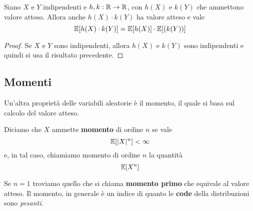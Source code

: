 \begin{corollary}
	Siano $X$ e $Y$ indipendenti e $h,k : \mathbb{R} \to \mathbb{R}$, con $h(X)$ e $k(Y)$ che ammettono valore
	atteso. Allora anche $h(X) \cdot k(Y)$ ha valore atteso e vale
	\[ \mathbb{E}[h(X) \cdot k(Y)] = \mathbb{E}[h(X)] \cdot \mathbb{E}[(k(Y))] \]
	\begin{proof}
		Se $X$ e $Y$ sono indipendenti, allora $h(X)$ e $k(Y)$ sono indipendenti e quindi si usa
		il risultato precedente.
	\end{proof}
\end{corollary}

\subsection{Momenti}
Un'altra proprietà delle variabili aleatorie è il momento, il quale si basa sul calcolo del valore
atteso.

\begin{definition}
	Diciamo che $X$ ammette \textbf{momento} di ordine $n$ se vale
	\[ \mathbb{E}[|X|^n] < \infty \]
	e, in tal caso, chiamiamo momento di ordine $n$ la quantità
	\[ \mathbb{E}[X^n] \]
\end{definition}

Se $n=1$ troviamo quello che si chiama \textbf{momento primo} che equivale al valore atteso. Il
momento, in generale è un indice di quanto le \textbf{code} della distribuzioni sono \emph{pesanti}.

